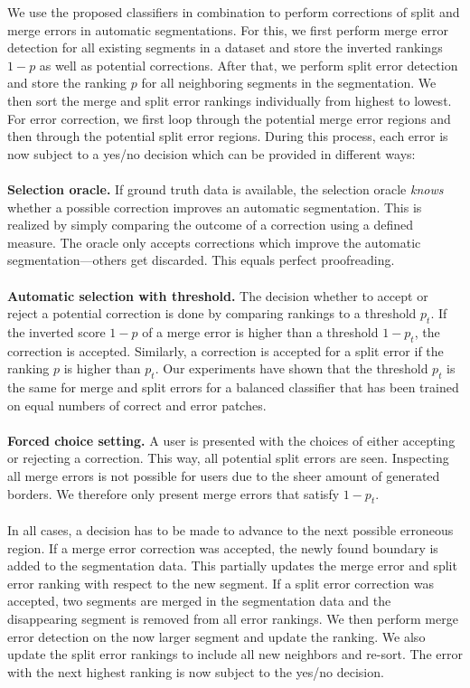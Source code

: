 We use the proposed classifiers in combination to perform corrections of split and merge errors in automatic segmentations. For this, we first perform merge error detection for all existing segments in a dataset and store the inverted rankings $1-p$ as well as potential corrections. After that, we perform split error detection and store the ranking $p$ for all neighboring segments in the segmentation. We then sort the merge and split error rankings individually from highest to lowest.
For error correction, we first loop through the potential merge error regions and then through the potential split error regions. During this process, each error is now subject to a yes/no decision which can be provided in different ways:
\\~\\
\textbf{Selection oracle.} If ground truth data is available, the selection oracle \textit{knows} whether a possible correction improves an automatic segmentation. This is realized by simply comparing the outcome of a correction using a defined measure. The oracle only accepts corrections which improve the automatic segmentation---others get
discarded. This equals perfect proofreading.
\\~\\
\textbf{Automatic selection with threshold.} The decision whether to accept or reject a potential correction is done by comparing rankings to a threshold $p_t$. If the inverted score $1-p$ of a merge error is higher than a threshold $1-p_t$, the correction is accepted. Similarly, a correction is accepted for a split error if the ranking $p$ is higher than $p_t$. Our experiments have shown that the threshold $p_t$ is the same for merge and split errors for a balanced classifier that has been trained on equal numbers of correct and error patches.
\\~\\
\textbf{Forced choice setting.} A user is presented with the choices of either accepting or rejecting a correction. This way, all potential split errors are seen. Inspecting all merge errors is not possible for users due to the sheer amount of generated borders. We therefore only present merge errors that satisfy $1-p_t$.
\\~\\
In all cases, a decision has to be made to advance to the next possible erroneous region. If a merge error correction was accepted, the newly found boundary is added to the segmentation data. This partially updates the merge error and split error ranking with respect to the new segment. If a split error correction was accepted, two segments are merged in the segmentation data and the disappearing segment is removed from all error rankings. We then perform merge error detection on the now larger segment and update the ranking. We also update the split error rankings to include all new neighbors and re-sort. The error with the next highest ranking is now subject to the yes/no decision.


